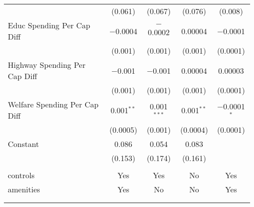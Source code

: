\begin{table}[!htbp]
\begin{tabular}{@{\extracolsep{5pt}}lcccc}
  & (0.061) & (0.067) & (0.076) & (0.008) \\ 
  Educ Spending Per Cap Diff & $-$0.0004 & $-$0.0002 & 0.00004 & $-$0.0001 \\ 
  & (0.001) & (0.001) & (0.001) & (0.0001) \\ 
  Highway Spending Per Cap Diff & $-$0.001 & $-$0.001 & 0.00004 & 0.00003 \\ 
  & (0.001) & (0.001) & (0.001) & (0.0001) \\ 
  Welfare Spending Per Cap Diff & 0.001$^{**}$ & 0.001$^{***}$ & 0.001$^{**}$ & $-$0.0001$^{*}$ \\ 
  & (0.0005) & (0.001) & (0.0004) & (0.0001) \\ 
  Constant & 0.086 & 0.054 & 0.083 &  \\ 
  & (0.153) & (0.174) & (0.161) &  \\ 
 \hline \\[-1.8ex] 
controls & Yes & Yes & No & Yes \\ 
amenities & Yes & No & No & Yes \\ 
\hline \\[-1.8ex] 
\hline 
\hline \\[-1.8ex] 
\end{tabular} 
\end{table} 
